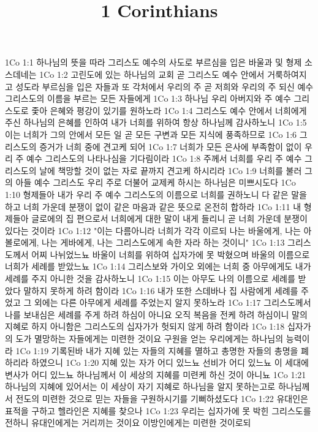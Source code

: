 

\title{1 Corinthians}

1Co 1:1  하나님의 뜻을 따라 그리스도 예수의 사도로 부르심을 입은 바울과 및 형제 소스데네는
1Co 1:2  고린도에 있는 하나님의 교회 곧 그리스도 예수 안에서 거룩하여지고 성도라 부르심을 입은 자들과 또 각처에서 우리의 주 곧 저희와 우리의 주 되신 예수 그리스도의 이름을 부르는 모든 자들에게
1Co 1:3  하나님 우리 아버지와 주 예수 그리스도로 좇아 은혜와 평강이 있기를 원하노라
1Co 1:4  그리스도 예수 안에서 너희에게 주신 하나님의 은혜를 인하여 내가 너희를 위하여 항상 하나님께 감사하노니
1Co 1:5  이는 너희가 그의 안에서 모든 일 곧 모든 구변과 모든 지식에 풍족하므로
1Co 1:6  그리스도의 증거가 너희 중에 견고케 되어
1Co 1:7  너희가 모든 은사에 부족함이 없이 우리 주 예수 그리스도의 나타나심을 기다림이라
1Co 1:8  주께서 너희를 우리 주 예수 그리스도의 날에 책망할 것이 없는 자로 끝까지 견고케 하시리라
1Co 1:9  너희를 불러 그의 아들 예수 그리스도 우리 주로 더불어 교제케 하시는 하나님은 미쁘시도다
1Co 1:10  형제들아 내가 우리 주 예수 그리스도의 이름으로 너희를 권하노니 다 같은 말을 하고 너희 가운데 분쟁이 없이 같은 마음과 같은 뜻으로 온전히 합하라
1Co 1:11  내 형제들아 글로에의 집 편으로서 너희에게 대한 말이 내게 들리니 곧 너희 가운데 분쟁이 있다는 것이라
1Co 1:12  "이는 다름아니라 너희가 각각 이르되 나는 바울에게, 나는 아볼로에게, 나는 게바에게, 나는 그리스도에게 속한 자라 하는 것이니"
1Co 1:13  그리스도께서 어찌 나뉘었느뇨 바울이 너희를 위하여 십자가에 못 박혔으며 바울의 이름으로 너희가 세례를 받았느뇨
1Co 1:14  그리스보와 가이오 외에는 너희 중 아무에게도 내가 세례를 주지 아니한 것을 감사하노니
1Co 1:15  이는 아무도 나의 이름으로 세례를 받았다 말하지 못하게 하려 함이라
1Co 1:16  내가 또한 스데바나 집 사람에게 세례를 주었고 그 외에는 다른 아무에게 세례를 주었는지 알지 못하노라
1Co 1:17  그리스도께서 나를 보내심은 세례를 주게 하려 하심이 아니요 오직 복음을 전케 하려 하심이니 말의 지혜로 하지 아니함은 그리스도의 십자가가 헛되지 않게 하려 함이라
1Co 1:18  십자가의 도가 멸망하는 자들에게는 미련한 것이요 구원을 얻는 우리에게는 하나님의 능력이라
1Co 1:19  기록된바 내가 지혜 있는 자들의 지혜를 멸하고 총명한 자들의 총명을 폐하리라 하였으니
1Co 1:20  지혜 있는 자가 어디 있느뇨 선비가 어디 있느뇨 이 세대에 변사가 어디 있느뇨 하나님께서 이 세상의 지혜를 미련케 하신 것이 아니뇨
1Co 1:21  하나님의 지혜에 있어서는 이 세상이 자기 지혜로 하나님을 알지 못하는고로 하나님께서 전도의 미련한 것으로 믿는 자들을 구원하시기를 기뻐하셨도다
1Co 1:22  유대인은 표적을 구하고 헬라인은 지혜를 찾으나
1Co 1:23  우리는 십자가에 못 박힌 그리스도를 전하니 유대인에게는 거리끼는 것이요 이방인에게는 미련한 것이로되

